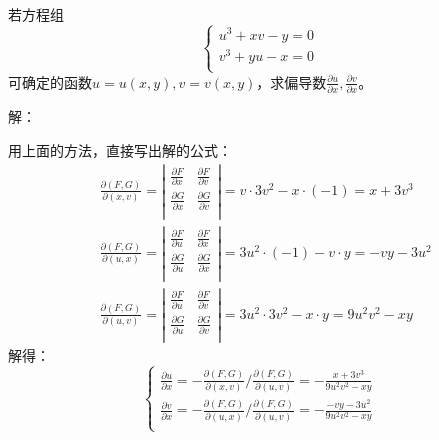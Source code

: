 ~

\begin{example}
若方程组
\[
\begin{cases}
	u^3+xv-y=0\\
	v^3+yu-x=0\\
\end{cases}
\]
可确定的函数$u=u\left( x,y \right) ,v=v\left( x,y \right) $，求偏导数$\frac{\partial u}{\partial x},\frac{\partial v}{\partial x}$。
\end{example}

解：

用上面的方法，直接写出解的公式：
\begin{align*}
&\frac{\partial \left( F,G \right)}{\partial \left( x,v \right)}=\left| \begin{matrix}
	\frac{\partial F}{\partial x}&		\frac{\partial F}{\partial v}\\
	\frac{\partial G}{\partial x}&		\frac{\partial G}{\partial v}\\
\end{matrix} \right|=v\cdot 3v^2-x\cdot \left( -1 \right) =x+3v^3 \\
&\frac{\partial \left( F,G \right)}{\partial \left( u,x \right)}=\left| \begin{matrix}
	\frac{\partial F}{\partial u}&		\frac{\partial F}{\partial x}\\
	\frac{\partial G}{\partial u}&		\frac{\partial G}{\partial x}\\
\end{matrix} \right|=3u^2\cdot \left( -1 \right) -v\cdot y=-vy-3u^2 \\
&\frac{\partial \left( F,G \right)}{\partial \left( u,v \right)}=\left| \begin{matrix}
	\frac{\partial F}{\partial u}&		\frac{\partial F}{\partial v}\\
	\frac{\partial G}{\partial u}&		\frac{\partial G}{\partial v}\\
\end{matrix} \right|=3u^2\cdot 3v^2-x\cdot y=9u^2v^2-xy
\end{align*}
解得：
\[
\begin{cases}
	\frac{\partial u}{\partial x}=-\frac{\partial \left( F,G \right)}{\partial \left( x,v \right)}/\frac{\partial \left( F,G \right)}{\partial \left( u,v \right)}=-\frac{x+3v^3}{9u^2v^2-xy}\\
	\frac{\partial v}{\partial x}=-\frac{\partial \left( F,G \right)}{\partial \left( u,x \right)}/\frac{\partial \left( F,G \right)}{\partial \left( u,v \right)}=-\frac{-vy-3u^2}{9u^2v^2-xy}\\
\end{cases}
\]

